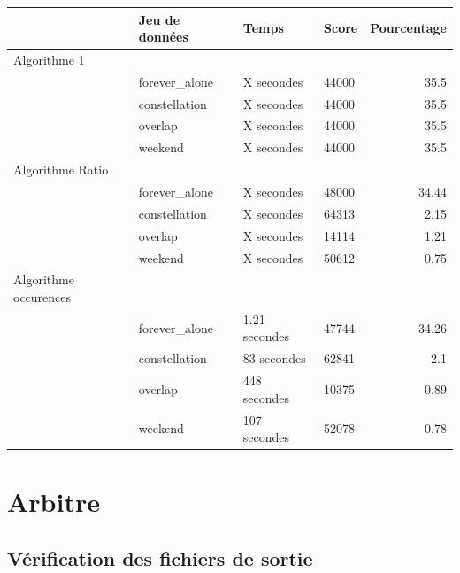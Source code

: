 \documentclass[11pt]{article}
\begin{document}
			\footnotesize
		\hspace*{-1cm}\noindent\begin{tabularx}{16cm}{|l|p{4cm}|X|p{2cm}|r|}
			\hline
			 & \textbf{Jeu de données} & \textbf{Temps} & \textbf{Score} & \textbf{Pourcentage} \\
			\hline
		    \cellcolor{blue!25} Algorithme 1 & & & & \\
		    \cellcolor{blue!25} & forever\_alone & X secondes & 44000 & 35.5 \\
		    \cellcolor{blue!25} & constellation & X secondes & 44000 & 35.5 \\
		    \cellcolor{blue!25} & overlap & X secondes & 44000 & 35.5 \\
		    \cellcolor{blue!25} & weekend & X secondes & 44000 & 35.5 \\
		    \hline
				\cellcolor{yellow!25} Algorithme Ratio & & & & \\
		    \cellcolor{yellow!25} & forever\_alone & X secondes & 48000 & 34.44 \\
		    \cellcolor{yellow!25} & constellation & X secondes & 64313 & 2.15 \\
		    \cellcolor{yellow!25} & overlap & X secondes & 14114 & 1.21 \\
		    \cellcolor{yellow!25} & weekend & X secondes & 50612 & 0.75 \\
				\hline
			\cellcolor{green!25} Algorithme occurences & & & & \\
		    \cellcolor{green!25} & forever\_alone & 1.21 secondes & 47744 & 34.26 \\
		    \cellcolor{green!25} & constellation & 83 secondes & 62841 & 2.1 \\
		    \cellcolor{green!25} & overlap & 448 secondes & 10375 & 0.89 \\
		    \cellcolor{green!25} & weekend & 107 secondes & 52078 & 0.78 \\
		    \hline
		\end{tabularx}
		\normalsize

	\section{Arbitre} %
	\label{sec:arbitre}
	
	\subsection{Vérification des fichiers de sortie}
	\label{subsection:Verification_des_fichiers_de_sortie}
\end{document}
